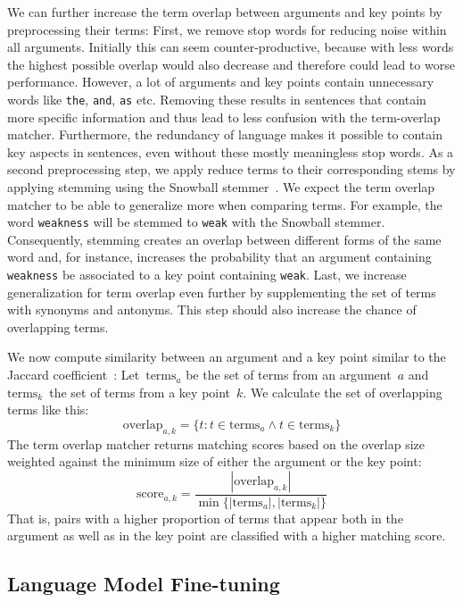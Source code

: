 We can further increase the term overlap between arguments and key points by preprocessing their terms:
First, we remove stop words for reducing noise within all arguments.
Initially this can seem counter-productive, because with less words the highest possible overlap would also decrease and therefore could lead to worse performance.
However, a lot of arguments and key points contain unnecessary words like \texttt{the}, \texttt{and}, \texttt{as} etc.
Removing these results in sentences that contain more specific information and thus lead to less confusion with the term-overlap matcher.
Furthermore, the redundancy of language makes it possible to contain key aspects in sentences, even without these mostly meaningless stop words.
As a second preprocessing step, we apply reduce terms to their corresponding stems by applying stemming using the Snowball stemmer~\cite{Porter1980}. 
We expect the term overlap matcher to be able to generalize more when comparing terms.
For example, the word \texttt{weakness} will be stemmed to \texttt{weak} with the Snowball stemmer. 
Consequently, stemming creates an overlap between different forms of the same word and, for instance, increases the probability that an argument containing \texttt{weakness} be associated to a key point containing \texttt{weak}.
Last, we increase generalization for term overlap even further by supplementing the set of terms with synonyms and antonyms. This step should also increase the chance of overlapping terms.

We now compute similarity between an argument and a key point similar to the Jaccard coefficient~\cite{Jaccard1902}:
Let~\(\text{terms}_a\) be the set of terms from an argument~\(a\) and \(\text{terms}_k\)~the set of terms from a key point~\(k\).
We calculate the set of overlapping terms like this:
\begin{equation}
    \text{overlap}_{a,k} = \{ t : t \in \text{terms}_a \land t \in \text{terms}_k \}
\end{equation}
The term overlap matcher returns matching scores based on the overlap size weighted against the minimum size of either the argument or the key point:
\begin{equation}
    \text{score}_{a,k} = \frac{ |\text{overlap}_{a,k}| }{ \min\{ |\text{terms}_a|, |\text{terms}_k| \} }
\end{equation}
That is, pairs with a higher proportion of terms that appear both in the argument as well as in the key point are classified with a higher matching score.

\subsection{Language Model Fine-tuning}

